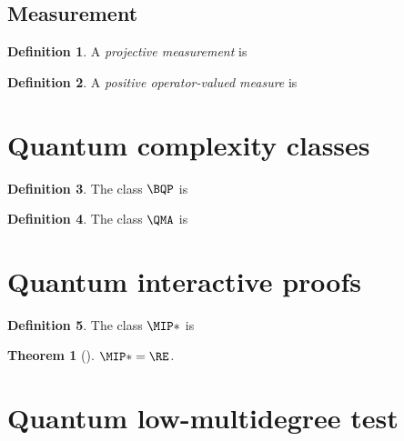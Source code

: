 \documentclass[english,12pt]{reedthesis}
\theoremstyle{plain}
\newtheorem{thm}{Theorem}[section]
\theoremstyle{definition}
\newtheorem{defn}[defn]{Definition}
\theoremstyle{remark}
\begin{document}
\subsection{Measurement}

\begin{defn}\label{def:projective-measure}
  A \emph{projective measurement} is
\end{defn}

\begin{defn}\label{def:povm}
  A \emph{positive operator-valued measure} is
\end{defn}

\section{Quantum complexity classes}

\begin{defn}\label{def:bqp}
  The class $\BQP$ is
\end{defn}

\begin{defn}\label{def:qma}
  The class $\QMA$ is
\end{defn}

\section{Quantum interactive proofs}\label{sec:quant-interactive}

\begin{defn}\label{def:mip-star}
  The class $\MIP*$ is
\end{defn}

\begin{thm}[{\cite{JNVWY21}}]\label{thm:mip-star-is-re}
  $\MIP* = \RE$.
\end{thm}

\section{Quantum low-multidegree test}
\end{document}
